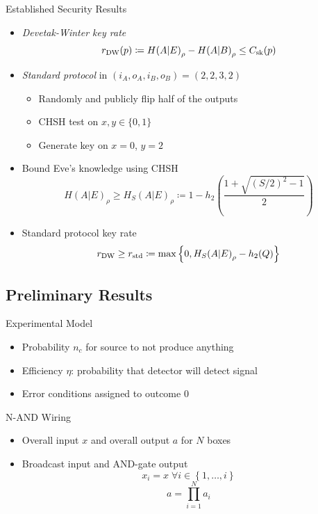 \documentclass[xcolor=dvipsnames]{beamer}
\newcommand{\?}{\mathrel{?}} %
\newcommand{\dintv}[2]{\left\{#1,\ldots,#2\right\}}
\newcommand{\sk}{\rm sk}
\newcommand{\DW}{\rm DW}
\newcommand{\std}{\rm std}
\begin{document}
\begin{frame}{Established Security Results}
    \begin{itemize}[<+->]
    \item \emph{Devetak-Winter key rate}
      \[ r_{\DW}(p) \coloneqq {H(A|E)}_{\rho} - {H(A|B)}_{\rho} \leq C_{\sk}(p) \]
    \item \emph{Standard protocol} in \((i_A, o_A, i_B, o_B) = (2,2,3,2)\)
      \begin{itemize}
        \item Randomly and publicly flip half of the outputs
        \item CHSH test on \(x, y \in \{0,1\}\)
        \item Generate key on \(x=0\), \(y=2\)
      \end{itemize}
    \item Bound Eve's knowledge using CHSH
      \[ {H(A|E)}_{\rho} \geq {H_S(A|E)}_{\rho} \coloneqq 1 - h_2\left( \frac{1 + \sqrt{{(S/2)}^2-1}}{2} \right) \]
    \item Standard protocol key rate
      \[ r_{\DW} \geq r_{\std} \coloneqq \max \left\{ 0, {H_S(A|E)}_{\rho} - h_2(Q) \right\} \]
    \end{itemize}
\end{frame}

\subsection{Preliminary Results}

\begin{frame}{Experimental Model}
  \begin{itemize}[<+->]
    \item Probability \(n_c\) for source to not produce anything
    \item Efficiency \(\eta\): probability that detector will detect signal
    \item Error conditions assigned to outcome \(0\)
  \end{itemize}
\end{frame}

\begin{frame}{N-AND Wiring}
  \begin{itemize}[<+->]
    \item Overall input \(x\) and overall output \(a\) for \(N\) boxes
    \item Broadcast input and AND-gate output
      \[ x_i = x\;\forall i \in \dintv{1}{i} \]
      \[ a = \prod_{i=1}^N a_i \]
  \end{itemize}
\end{frame}
\end{document}
